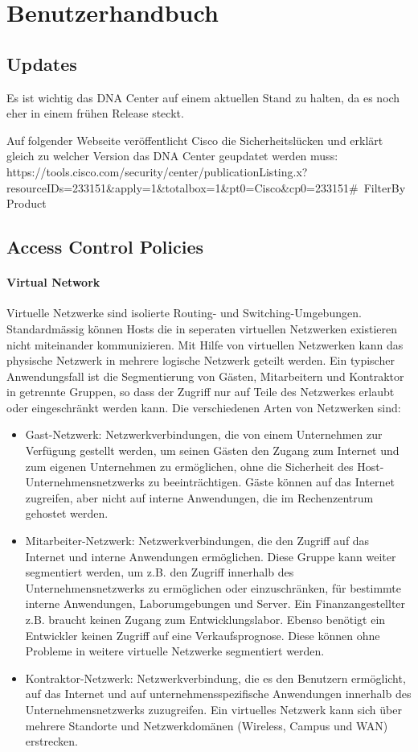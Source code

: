 \section{Benutzerhandbuch}

\subsection{Updates}
Es ist wichtig das DNA Center auf einem aktuellen Stand zu halten, da es noch eher in einem frühen Release steckt.

Auf folgender Webseite veröffentlicht Cisco die Sicherheitslücken und erklärt gleich zu welcher Version das DNA Center geupdatet werden muss:
https://tools.cisco.com/security/center/publicationListing.x?resourceIDs=233151\&apply=1\&totalbox=1\&pt0=Cisco\&cp0=233151\#~FilterByProduct


\subsection{Access Control Policies}

\paragraph{Virtual Network}
Virtuelle Netzwerke sind isolierte Routing- und Switching-Umgebungen. Standardmässig können Hosts die in seperaten virtuellen Netzwerken existieren nicht miteinander kommunizieren. Mit Hilfe von virtuellen Netzwerken kann das physische Netzwerk in mehrere logische Netzwerk geteilt werden. Ein typischer Anwendungsfall ist die Segmentierung von Gästen, Mitarbeitern und Kontraktor in getrennte Gruppen, so dass der Zugriff nur auf Teile des Netzwerkes erlaubt oder eingeschränkt werden kann. Die verschiedenen Arten von Netzwerken sind:

\begin{itemize}
	\item Gast-Netzwerk: Netzwerkverbindungen, die von einem Unternehmen zur Verfügung gestellt werden, um seinen Gästen den Zugang zum Internet und zum eigenen Unternehmen zu ermöglichen, ohne die Sicherheit des Host-Unternehmensnetzwerks zu beeinträchtigen. Gäste können auf das Internet zugreifen, aber nicht auf interne Anwendungen, die im Rechenzentrum gehostet werden.
	\item Mitarbeiter-Netzwerk: Netzwerkverbindungen, die den Zugriff auf das Internet und interne Anwendungen ermöglichen. Diese Gruppe kann weiter segmentiert werden, um z.B. den Zugriff innerhalb des Unternehmensnetzwerks zu ermöglichen oder einzuschränken, für bestimmte interne Anwendungen, Laborumgebungen und Server. Ein Finanzangestellter z.B. braucht keinen Zugang zum Entwicklungslabor. Ebenso benötigt ein Entwickler keinen Zugriff auf eine Verkaufsprognose. Diese können ohne Probleme in weitere virtuelle Netzwerke segmentiert werden.
	\item Kontraktor-Netzwerk: Netzwerkverbindung, die es den Benutzern ermöglicht, auf das Internet und auf unternehmensspezifische Anwendungen innerhalb des Unternehmensnetzwerks zuzugreifen. Ein virtuelles Netzwerk kann sich über mehrere Standorte und Netzwerkdomänen (Wireless, Campus und WAN) erstrecken.
\end{itemize}


